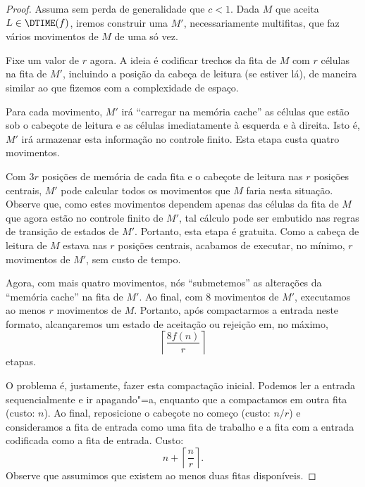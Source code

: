 \begin{proof}
    Assuma sem perda de generalidade que $c < 1$.
    Dada $M$ que aceita $L \in \DTIME(f)$,
    iremos construir uma $M'$,
    necessariamente multifitas,
    que faz vários movimentos de $M$ de uma só vez.

    Fixe um valor de $r$ agora.
    A ideia é codificar trechos da fita de $M$
    com $r$ células
    na fita de $M'$,
    incluindo a posição da cabeça de leitura
    (se estiver lá),
    de maneira similar ao que fizemos com a complexidade de espaço.

    Para cada movimento,
    $M'$ irá ``carregar na memória cache''
    as células que estão sob o cabeçote de leitura
    e as células imediatamente à esquerda e à direita.
    Isto é, $M'$ irá armazenar esta informação
    no controle finito.
    Esta etapa custa quatro movimentos.

    Com $3r$ posições de memória de cada fita
    e o cabeçote de leitura nas $r$ posições centrais,
    $M'$ pode calcular todos os movimentos que $M$ faria nesta situação.
    Observe que,
    como estes movimentos dependem apenas
    das células da fita de $M$
    que agora estão no controle finito de $M'$,
    tal cálculo pode ser embutido nas regras de transição de estados de $M'$.
    Portanto, esta etapa é gratuita.
    Como a cabeça de leitura de $M$ estava nas $r$ posições centrais,
    acabamos de executar,
    no mínimo,
    $r$ movimentos de $M'$,
    sem custo de tempo.

    Agora, com mais quatro movimentos,
    nós ``submetemos'' as alterações da ``memória cache''
    na fita de $M'$.
    Ao final, com $8$ movimentos de $M'$,
    executamos ao menos $r$ movimentos de $M$.
    Portanto, após compactarmos a entrada
    neste formato,
    alcançaremos um estado de aceitação ou rejeição
    em, no máximo,
    \begin{equation*}
        \left\lceil \frac{8f(n)}{r} \right\rceil
    \end{equation*}
    etapas.

    O problema é,
    justamente,
    fazer esta compactação inicial.
    Podemos ler a entrada sequencialmente
    e ir apagando"=a,
    enquanto que a compactamos em outra fita
    (custo: $n$).
    Ao final,
    reposicione o cabeçote no começo
    (custo: $n/r$)
    e consideramos a fita de entrada como uma fita de trabalho
    e a fita com a entrada codificada
    como a fita de entrada.
    Custo:
    \begin{equation*}
        n + \left\lceil \frac n r \right\rceil.
    \end{equation*}
    Observe que assumimos
    que existem ao menos duas fitas disponíveis.


\end{proof}
